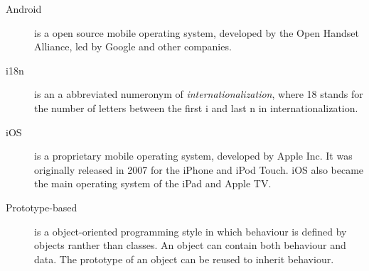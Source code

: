 

\begin{description}
\item[Android] is a open source mobile operating system, developed by the Open Handset Alliance, led by Google and other companies.\cite{Inc.2012}

\item[i18n] is an a abbreviated numeronym of \emph{internationalization}, where 18 stands for the number of letters between the first i and last n in internationalization.

\item[iOS]is a proprietary mobile operating system, developed by Apple Inc. It was originally released in 2007 for the iPhone and iPod Touch. iOS also became the main operating system of the iPad and Apple TV.\cite{Sylvain2012}

\item[Prototype-based] is a object-oriented programming style in which behaviour is defined by objects ranther than classes. An object can contain both behaviour and data. The prototype of an object can be reused to inherit behaviour.
\end{description}
